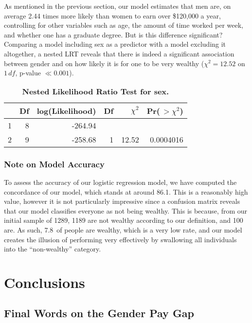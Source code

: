 \documentclass{article}
\newcommand*\pct{\scalebox{.85}{\%}}
\begin{document}
As mentioned in the previous section, our model estimates that men are, on average 2.44 times more likely than women to earn over \$120,000 a year, controlling for other variables such as age, the amount of time worked per week, and whether one has a graduate degree. But is this difference significant? Comparing a model including sex as a predictor with a model excluding it altogether, a nested LRT reveals that there is indeed a significant association between gender and on how likely it is for one to be very wealthy ($\chi^2 = 12.52$ on $1 \, df$, p-value $\ll 0.001$).

\begin{table}[ht]
\centering
\begin{tabular}{lrrrrr}
  \toprule
  & Df & log(Likelihood) & Df & $\chi^2$ & Pr($\,> \chi^2$) \\ 
  \midrule
  1 & 8 & -264.94 &  &  &  \\ 
  2 & 9 & -258.68 & 1 & 12.52 & 0.0004016 \\ 
  \bottomrule
\end{tabular}
\caption{\textbf{Nested Likelihood Ratio Test for sex.}}
\label{lrt1}
\end{table}

\subsubsection{Note on Model Accuracy}

To assess the accuracy of our logistic regression model, we have computed the concordance of our model, which stands at around 86.1\pct. This is a reasonably high value, however it is not particularly impressive since a confusion matrix reveals that our model classifies everyone as not being wealthy. This is because, from our initial sample of 1289, 1189 are not wealthy according to our definition, and 100 are. As such, 7.8\pct \, of people are wealthy, which is a very low rate, and our model creates the illusion of performing very effectively by swallowing all individuals into the ``non-wealthy'' category.

\section{Conclusions}

\subsection{Final Words on the Gender Pay Gap}
\end{document}
